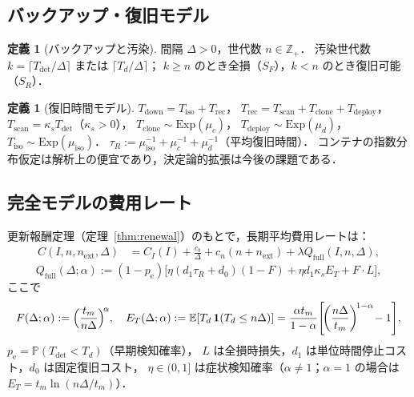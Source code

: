 \documentclass[12pt,a4paper]{article}
\theoremstyle{plain}
\theoremstyle{definition}
\newtheorem{definition}[theorem]{定義}
\theoremstyle{remark}
\newcommand{\E}{\mathbb{E}}
\newcommand{\Prob}{\mathbb{P}}
\newcommand{\Z}{\mathbb{Z}}
\newcommand{\pe}{p_{\mathrm{e}}}
\newcommand{\Qf}{Q_{\mathrm{full}}}
\newcommand{\Tdet}{T_{\mathrm{det}}}
\newcommand{\Trec}{T_{\mathrm{rec}}}
\newcommand{\Tdown}{T_{\mathrm{down}}}
\begin{document}
\subsection{バックアップ・復旧モデル}

\begin{definition}[バックアップと汚染]\label{def:backup}
間隔 $\Delta>0$，世代数 $n\in\Z_+$．
汚染世代数 $k=\lceil\Tdet/\Delta\rceil$ または $\lceil T_d/\Delta\rceil$；
$k\ge n$ のとき全損（$S_F$），$k<n$ のとき復旧可能（$S_R$）．
\end{definition}

\begin{definition}[復旧時間モデル]\label{def:recovery}
$\Tdown=T_{\mathrm{iso}}+\Trec$，
$\Trec=T_{\mathrm{scan}}+T_{\mathrm{clone}}+T_{\mathrm{deploy}}$，
$T_{\mathrm{scan}}=\kappa_s\Tdet$（$\kappa_s>0$），
$T_{\mathrm{clone}}\sim\mathrm{Exp}(\mu_c)$，
$T_{\mathrm{deploy}}\sim\mathrm{Exp}(\mu_d)$，
$T_{\mathrm{iso}}\sim\mathrm{Exp}(\mu_{\mathrm{iso}})$．
$\tau_R:=\mu_{\mathrm{iso}}^{-1}+\mu_c^{-1}+\mu_d^{-1}$（平均復旧時間）．
コンテナの指数分布仮定は解析上の便宜であり，決定論的拡張は今後の課題である．
\end{definition}

\subsection{完全モデルの費用レート}

更新報酬定理（定理~\ref{thm:renewal}）のもとで，長期平均費用レートは：
\begin{align}
C(I,n,n_{\mathrm{ext}},\Delta)
&= C_I(I)+\frac{c_b}{\Delta}+c_n(n+n_{\mathrm{ext}})+\lambda\Qf(I,n,\Delta),\label{eq:cost_rate}
\end{align}
\begin{equation}\label{eq:Qfull}
\Qf(\Delta;\alpha)
:=(1-\pe)\bigl[\eta(d_1\tau_R+d_0)(1-F)+\eta d_1\kappa_s E_T+F\cdot L\bigr],
\end{equation}
ここで
\begin{equation}\label{eq:components}
F(\Delta;\alpha):=\Bigl(\frac{t_m}{n\Delta}\Bigr)^{\!\alpha},\quad
E_T(\Delta;\alpha):=\E[T_d\,\mathbf{1}(T_d\le n\Delta)]
=\frac{\alpha t_m}{1-\alpha}\!\left[\!\left(\frac{n\Delta}{t_m}\right)^{\!1-\alpha}\!-1\right]\!,
\end{equation}
$\pe=\Prob(\Tdet<T_d)$（早期検知確率），
$L$ は全損時損失，$d_1$ は単位時間停止コスト，$d_0$ は固定復旧コスト，
$\eta\in(0,1]$ は症状検知確率（$\alpha\ne1$；$\alpha=1$ の場合は $E_T=t_m\ln(n\Delta/t_m)$）．
\end{document}
